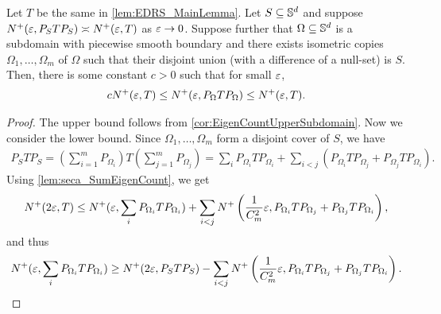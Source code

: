 \begin{lemma}
  \label{lem:C_EigenCountAsympSubdomain}
  Let $T$ be the same in \cref{lem:EDRS_MainLemma}.
  Let $S \subseteq \mathbb{S}^d$ and suppose $N^+(\varepsilon, P_{S} T P_{S}) \asymp N^+(\varepsilon,T)$ as $\varepsilon \to 0$.
  Suppose further that $\Omega \subseteq \mathbb{S}^d$ is a subdomain with piecewise smooth boundary and
  there exists isometric copies $\Omega_1,\dots,\Omega_m$ of $\Omega$ such that their disjoint union
  (with a difference of a null-set) is $S$.
  Then, there is some constant $c > 0$ such that for small $\varepsilon$,
  \begin{align}
    \label{eq:EigenCountAsympSubdomain}
    c N^+(\varepsilon,T) \leq  N^+(\varepsilon, P_{\Omega} T P_{\Omega}) \leq N^+(\varepsilon,T).
  \end{align}
\end{lemma}
\begin{proof}
  The upper bound follows from \cref{cor:EigenCountUpperSubdomain}.
  Now we consider the lower bound.
  Since $\Omega_1,\dots,\Omega_m$ form a disjoint cover of $S$, we have
  \begin{align*}
    P_{S} T P_{S} = (\sum_{i=1}^m P_{\Omega_i}) T (\sum_{j=1}^m P_{\Omega_j}) = \sum_{i} P_{\Omega_i} T P_{\Omega_i}
    + \sum_{i < j} \left( P_{\Omega_i} T P_{\Omega_j} + P_{\Omega_j} T P_{\Omega_i} \right).
  \end{align*}
  Using \cref{lem:seca_SumEigenCount}, we get
  \begin{align*}
    N^+(2\varepsilon, T)
    \leq N^+(\varepsilon, \sum_{i} P_{\Omega_i} T P_{\Omega_i})
    + \sum_{i < j} N^+\left( \frac{1}{C_m^2}\varepsilon,  P_{\Omega_i} T P_{\Omega_j} + P_{\Omega_j} T P_{\Omega_i} \right),
  \end{align*}
  and thus
  \begin{align*}
    N^+(\varepsilon, \sum_{i} P_{\Omega_i} T P_{\Omega_i})
    \geq N^+(2\varepsilon, P_{S} T P_{S})
    -\sum_{i < j} N^+\left( \frac{1}{C_m^2}\varepsilon,  P_{\Omega_i} T P_{\Omega_j} + P_{\Omega_j} T P_{\Omega_i} \right).
  \end{align*}


\end{proof}
